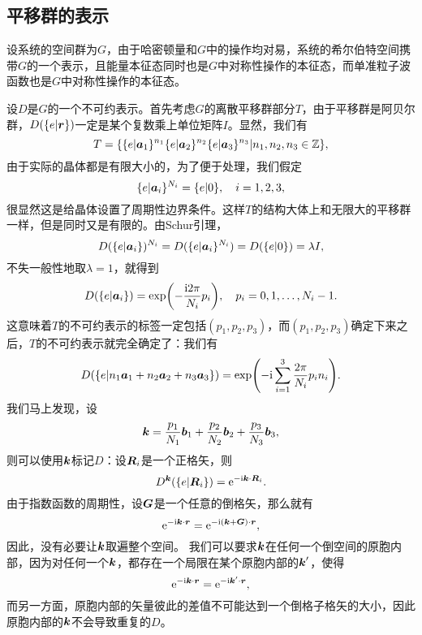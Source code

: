 \subsection{平移群的表示}\label{sec:transition-group-rep}

设系统的空间群为$G$，由于哈密顿量和$G$中的操作均对易，系统的希尔伯特空间携带$G$的一个表示，且能量本征态同时也是$G$中对称性操作的本征态，而单准粒子波函数也是$G$中对称性操作的本征态。

设$D$是$G$的一个不可约表示。首先考虑$G$的离散平移群部分$T$，由于平移群是阿贝尔群，$D(\{ e | \vb*{r}\})$一定是某个复数乘上单位矩阵$I$。显然，我们有
\begin{equation}
    T = \{ \{e | \vb*{a}_1\}^{n_1} \{e | \vb*{a}_2\}^{n_2} \{e | \vb*{a}_3\}^{n_3} | n_1, n_2, n_3 \in \mathbb{Z} \},
\end{equation}
由于实际的晶体都是有限大小的，为了便于处理，我们假定
\begin{equation}
    \{e | \vb*{a}_i\}^{N_i} = \{e | 0\}, \quad i = 1, 2, 3,
\end{equation}
很显然这是给晶体设置了周期性边界条件。这样$T$的结构大体上和无限大的平移群一样，但是同时又是有限的。由Schur引理，
\[
    D(\{e | \vb*{a}_i \})^{N_i} = D(\{e | \vb*{a}_i \}^{N_i}) = D(\{e | 0\}) = \lambda I,
\]
不失一般性地取$\lambda = 1$，就得到
\begin{equation}
    D(\{e | \vb*{a}_i\}) = \exp(- \frac{\mathrm{i} 2 \pi}{N_i} p_i), \quad p_i = 0, 1, \ldots, N_i - 1.
\end{equation}
这意味着$T$的不可约表示的标签一定包括$(p_1, p_2, p_3)$，而$(p_1, p_2, p_3)$确定下来之后，$T$的不可约表示就完全确定了：我们有
\begin{equation}
    D(\{e | n_1 \vb*{a}_1 + n_2 \vb*{a}_2 + n_3 \vb*{a}_3\}) = \exp(- \mathrm{i} \sum_{i=1}^3 \frac{2\pi}{N_i} p_i n_i ).
\end{equation}
我们马上发现，设
\begin{equation}
    \vb*{k} = \frac{p_1}{N_1} \vb*{b}_1 + \frac{p_2}{N_2} \vb*{b}_2 + \frac{p_3}{N_3} \vb*{b}_3,
\end{equation}
则可以使用$\vb*{k}$标记$D$：设$\vb*{R}_i$是一个正格矢，则
\begin{equation}
    D^{\vb*{k}}(\{e | \vb*{R}_i \}) = \mathrm{e}^{- \mathrm{i} \vb*{k} \cdot \vb*{R}_i}.
\end{equation}
由于指数函数的周期性，设$\vb*{G}$是一个任意的倒格矢，那么就有
\[
    \mathrm{e}^{- \mathrm{i} \vb*{k} \cdot \vb*{r}} = \mathrm{e}^{- \mathrm{i} (\vb*{k} + \vb*{G}) \cdot \vb*{r}},
\]
因此，没有必要让$\vb*{k}$取遍整个空间。
我们可以要求$\vb*{k}$在任何一个倒空间的原胞内部，因为对任何一个$\vb*{k}$，都存在一个局限在某个原胞内部的$\vb*{k}'$，使得
\[
    \mathrm{e}^{- \mathrm{i} \vb*{k} \cdot \vb*{r}} = \mathrm{e}^{- \mathrm{i} \vb*{k}' \cdot \vb*{r}},
\]
而另一方面，原胞内部的矢量彼此的差值不可能达到一个倒格子格矢的大小，因此原胞内部的$\vb*{k}$不会导致重复的$D$。

